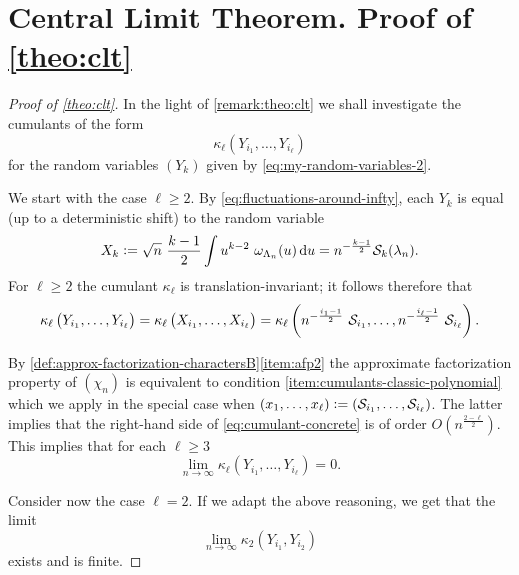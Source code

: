 \documentclass[12pt,usenames,dvipsnames,svgnames,table]{amsart}
\begin{document}
\section{Central Limit Theorem. Proof of \cref{theo:clt}} 
\label{sec:proof-of-CLTCLT}

\begin{proof}[Proof of \cref{theo:clt}]
	
	In the light of \cref{remark:theo:clt} we shall investigate the cumulants of the form
	\[ \kappa_\ell \left(Y_{i_1}, \dots, Y_{i_\ell}  \right)\]
	for the random variables $(Y_k)$ given by \eqref{eq:my-random-variables-2}.
	
	\bigskip
	
	
	
	We start with the case $\ell\geq 2$. 
	By \eqref{eq:fluctuations-around-infty}, each $Y_k$ is equal (up to a deterministic shift) to
	the random variable
	\[ X_k:= 
	\sqrt{n}\ \frac{k-1}{2} \int  u^{k-2} \ \omega_{\Lambda_n}(u) \dif u =
	n^{-\frac{k-1}{2}} \Sfunct_k(\lambda_n). 
	\]
	For $\ell\geq 2$ the cumulant $\kappa_\ell$ is translation-invariant;
	it follows therefore that
	\begin{equation}
	\label{eq:cumulant-concrete}
	\kappa_\ell \left( Y_{i_1},\dots, Y_{i_\ell} \right)=
	\kappa_\ell \left( X_{i_1},\dots, X_{i_\ell} \right)=
	\kappa_\ell \left( {{n}^{-\frac{i_1-1}{2}}}\ \mathcal{S}_{i_1}, \dots, 
	{{n}^{-\frac{i_\ell-1}{2}}}\ \mathcal{S}_{i_\ell}    \right).
	\end{equation}
	
	By \cref{def:approx-factorization-charactersB}\ref{item:afp2} 
	the approximate factorization property of $(\chi_n)$ is equivalent to condition 
	\ref{item:cumulants-classic-polynomial} which we apply in the special case when
	$(x_1,\dots,x_{\ell}):=(\mathcal{S}_{i_1},\dots,\mathcal{S}_{i_\ell})$.
	The latter implies  that the right-hand side of 
	\eqref{eq:cumulant-concrete}
	is of order
	$O\left( {n}^{\frac{2-\ell}{2}} \right)$.
	This implies that for each $\ell\geq 3$
	\[ \lim_{n\to\infty} \kappa_\ell \left( Y_{i_1},\dots, Y_{i_\ell} \right) = 0.\]
	
	\smallskip
	
	Consider now the case $\ell=2$. If we adapt the above reasoning, 
	we get that
	the limit
	\[ \lim_{n\to\infty} \kappa_2\left( Y_{i_1}, Y_{i_2} \right)\]
	exists and is finite.
	

\end{proof}
\end{document}
